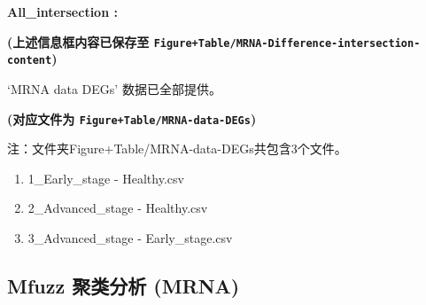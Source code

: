 \documentclass[
]{article}
\providecommand{\tightlist}{%
  \setlength{\itemsep}{0pt}\setlength{\parskip}{0pt}}
\begin{document}
\begin{center}\vspace{1.5cm}\end{center}\begin{center}\begin{tcolorbox}[colback=gray!10, colframe=gray!50, width=0.9\linewidth, arc=1mm, boxrule=0.5pt]
\textbf{
All\_intersection
:}

\vspace{0.5em}



\vspace{2em}
\end{tcolorbox}
\end{center}

\textbf{(上述信息框内容已保存至 \texttt{Figure+Table/MRNA-Difference-intersection-content})}

\begin{center}\vspace{1.5cm}\end{center}

`MRNA data DEGs' 数据已全部提供。

\textbf{(对应文件为 \texttt{Figure+Table/MRNA-data-DEGs})}

\begin{center}\begin{tcolorbox}[colback=gray!10, colframe=gray!50, width=0.9\linewidth, arc=1mm, boxrule=0.5pt]注：文件夹Figure+Table/MRNA-data-DEGs共包含3个文件。

\begin{enumerate}\tightlist
\item 1\_Early\_stage - Healthy.csv
\item 2\_Advanced\_stage - Healthy.csv
\item 3\_Advanced\_stage - Early\_stage.csv
\end{enumerate}\end{tcolorbox}
\end{center}

\begin{center}\vspace{1.5cm}\end{center}

\hypertarget{mfuzz-ux805aux7c7bux5206ux6790-mrna}{%
\subsection{Mfuzz 聚类分析 (MRNA)}\label{mfuzz-ux805aux7c7bux5206ux6790-mrna}}
\end{document}

